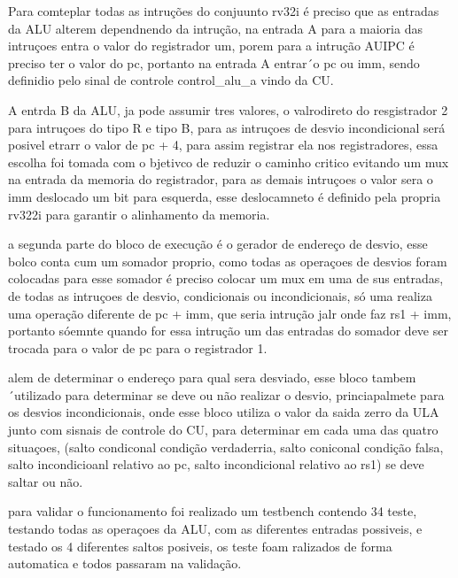 Para comteplar todas as intruções do conjuunto rv32i é preciso que as entradas da ALU alterem dependnendo da intrução, na entrada A para a maioria das intruçoes entra o valor do registrador um, porem para a intrução AUIPC é preciso ter o valor do pc, portanto na entrada A entrar´o pc ou imm, sendo definidio pelo sinal de controle control_alu_a vindo da CU.

A entrda B da ALU, ja pode assumir tres valores, o valrodireto do resgistrador 2 para intruçoes do tipo R e tipo B, para as intruçoes de desvio incondicional será posivel etrarr o valor de pc + 4, para assim registrar ela nos registradores, essa escolha foi tomada com o bjetivco de reduzir o caminho critico evitando um mux na entrada da memoria do registrador, para as demais intruçoes o valor sera o imm deslocado um bit para esquerda, esse deslocamneto é definido pela propria rv322i para garantir o alinhamento da memoria.

a segunda parte do bloco de execução é o gerador de endereço de desvio, esse bolco conta cum um somador proprio, como todas as operaçoes de desvios foram colocadas para esse somador é preciso colocar um mux em uma de sus entradas, de todas as intruçoes de desvio, condicionais ou incondicionais, só uma realiza uma operação diferente de pc + imm, que seria  intrução jalr onde faz rs1 + imm, portanto sóemnte quando for essa intrução um das entradas do somador deve ser trocada para o valor de pc para o registrador 1. 


alem de determinar o endereço para qual sera desviado, esse bloco tambem ´utilizado para determinar se deve ou não realizar o desvio, princiapalmete para os desvios incondicionais, onde esse bloco utiliza o valor da saida zerro da ULA junto com sisnais de controle do CU, para determinar em cada uma das quatro situaçoes, (salto condiconal condição verdaderria, salto coniconal condição falsa, salto incondicioanl relativo ao pc, salto incondicional relativo ao rs1) se deve saltar ou não.



para validar o funcionamento foi realizado um testbench contendo 34 teste, testando todas as operaçoes da ALU, com as diferentes entradas possiveis, e testado os 4 diferentes saltos posiveis, os teste foam ralizados de forma automatica e todos passaram na validação.

